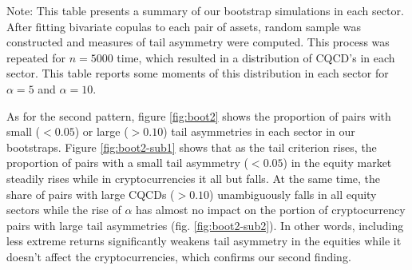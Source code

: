 \documentclass{article}
\begin{document}
\begin{table}[H]
\begin{threeparttable}
\begin{tabular}{lcccccccccccc}
\bottomrule
\end{tabular}
\begin{tablenotes}      
\item Note: This table presents a summary of our bootstrap simulations in each sector. After fitting bivariate copulas to each pair of assets, random sample was constructed and measures of tail asymmetry were computed. This process was repeated for $n=5000$ time, which resulted in a distribution of CQCD's in each sector. This table reports some moments of this distribution in each sector for $\alpha = 5$ and $\alpha = 10$.    
\end{tablenotes}
\end{threeparttable}
\end{table}

As for the second pattern, figure \ref{fig:boot2} shows the proportion of pairs with small ($<0.05$) or large ($>0.10$) tail asymmetries in each sector in our bootstraps. Figure \ref{fig:boot2-sub1} shows that as the tail criterion rises, the proportion of pairs with a small tail asymmetry ($<0.05$) in the equity market steadily rises while in cryptocurrencies it all but falls. At the same time, the share of pairs with large CQCDs ($>0.10$) unambiguously falls in all equity sectors while the rise of $\alpha$ has almost no impact on the portion of cryptocurrency pairs with large tail asymmetries (fig. \ref{fig:boot2-sub2}). In other words, including less extreme returns significantly weakens tail asymmetry in the equities while it doesn't affect the cryptocurrencies, which confirms our second finding. 
\end{document}
